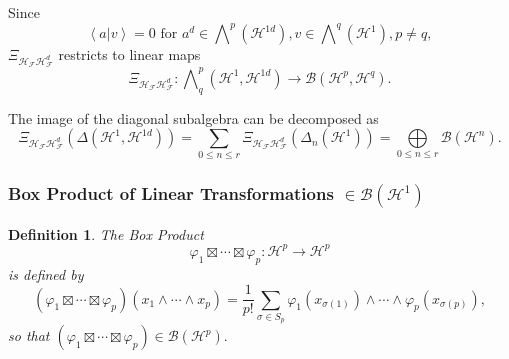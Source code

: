 \documentclass[aps,preprint]{revtex4}%
\newtheorem{definition}[theorem]{Definition}
\begin{document}
Since
\begin{equation}
\left\langle \left.  a\right\vert v\right\rangle =0\text{ for }a^{d}\in%
{\textstyle\bigwedge\nolimits^{p}}
\left(  \mathcal{H}^{1d}\right)  ,v\in%
{\textstyle\bigwedge\nolimits^{q}}
\left(  \mathcal{H}^{1}\right)  ,p\neq q,
\end{equation}
$\Xi_{\mathcal{H}_{\mathcal{F}}\mathcal{H}_{\mathcal{F}}^{d}}$ restricts to
linear maps
\begin{equation}
\Xi_{\mathcal{H}_{\mathcal{F}}\mathcal{H}_{\mathcal{F}}^{d}}:%
{\textstyle\bigwedge\nolimits_{q}^{p}}
\left(  \mathcal{H}^{1},\mathcal{H}^{1d}\right)  \rightarrow\mathcal{B}\left(
\mathcal{H}^{p},\mathcal{H}^{q}\right)  .
\end{equation}


The image of the diagonal subalgebra can be decomposed as
\begin{equation}
\Xi_{\mathcal{H}_{\mathcal{F}}\mathcal{H}_{\mathcal{F}}^{d}}\left(
\Delta\left(  \mathcal{H}^{1},\mathcal{H}^{1d}\right)  \right)  =\sum_{0\leq
n\leq r}\Xi_{\mathcal{H}_{\mathcal{F}}\mathcal{H}_{\mathcal{F}}^{d}}\left(
\Delta_{n}\left(  \mathcal{H}^{1}\right)  \right)  =%
{\textstyle\bigoplus\limits_{0\leq n\leq r}}
\mathcal{B}\left(  \mathcal{H}^{n}\right)  .
\end{equation}


\subsubsection{Box Product of Linear Transformations $\in\mathcal{B}\left(
\mathcal{H}^{1}\right)  $}

\begin{definition}
The Box Product
\begin{equation}
\varphi_{1}\boxtimes\cdots\boxtimes\varphi_{p}:\mathcal{H}^{p}\rightarrow
\mathcal{H}^{p}%
\end{equation}
is defined by
\begin{equation}
\left(  \varphi_{1}\boxtimes\cdots\boxtimes\varphi_{p}\right)  \left(
x_{1}\wedge\cdots\wedge x_{p}\right)  =\frac{1}{p!}\sum_{\sigma\in S_{p}%
}\varphi_{1}\left(  x_{\sigma\left(  1\right)  }\right)  \wedge\cdots
\wedge\varphi_{p}\left(  x_{\sigma\left(  p\right)  }\right)  ,
\end{equation}
so that $\left(  \varphi_{1}\boxtimes\cdots\boxtimes\varphi_{p}\right)
\in\mathcal{B}\left(  \mathcal{H}^{p}\right)  .$
\end{definition}
\end{document}
